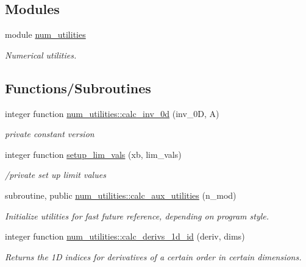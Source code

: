 \subsection*{Modules}
\begin{DoxyCompactItemize}
\item 
module \hyperlink{namespacenum__utilities}{num\+\_\+utilities}
\begin{DoxyCompactList}\small\item\em Numerical utilities. \end{DoxyCompactList}\end{DoxyCompactItemize}
\subsection*{Functions/\+Subroutines}
\begin{DoxyCompactItemize}
\item 
integer function \hyperlink{namespacenum__utilities_ac6699d422f3a588b51234c2d62ff389f}{num\+\_\+utilities\+::calc\+\_\+inv\+\_\+0d} (inv\+\_\+0D, A)
\begin{DoxyCompactList}\small\item\em private constant version \end{DoxyCompactList}\item 
integer function \hyperlink{num__utilities_8f90_a41f0ec23e08348e7498587997f483a00}{setup\+\_\+lim\+\_\+vals} (xb, lim\+\_\+vals)
\begin{DoxyCompactList}\small\item\em /private set up limit values \end{DoxyCompactList}\item 
subroutine, public \hyperlink{namespacenum__utilities_af461ae4c95a7a45da875dcf311e323f5}{num\+\_\+utilities\+::calc\+\_\+aux\+\_\+utilities} (n\+\_\+mod)
\begin{DoxyCompactList}\small\item\em Initialize utilities for fast future reference, depending on program style. \end{DoxyCompactList}\item 
integer function \hyperlink{namespacenum__utilities_af2e9ffd7ce2f9391bf8b6f1c344fabca}{num\+\_\+utilities\+::calc\+\_\+derivs\+\_\+1d\+\_\+id} (deriv, dims)
\begin{DoxyCompactList}\small\item\em Returns the 1D indices for derivatives of a certain order in certain dimensions. \end{DoxyCompactList}\item 

\end{DoxyCompactItemize}
